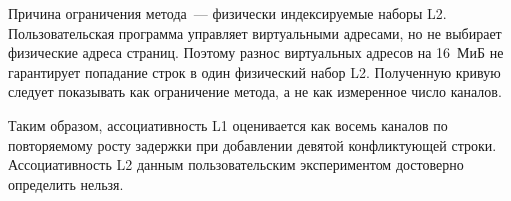 
Причина ограничения метода~--- физически индексируемые наборы L2. Пользовательская программа управляет виртуальными адресами, но не выбирает физические адреса страниц. Поэтому разнос виртуальных адресов на 16~МиБ не гарантирует попадание строк в один физический набор L2. Полученную кривую следует показывать как ограничение метода, а не как измеренное число каналов.

Таким образом, ассоциативность L1 оценивается как восемь каналов по повторяемому росту задержки при добавлении девятой конфликтующей строки. Ассоциативность L2 данным пользовательским экспериментом достоверно определить нельзя.
